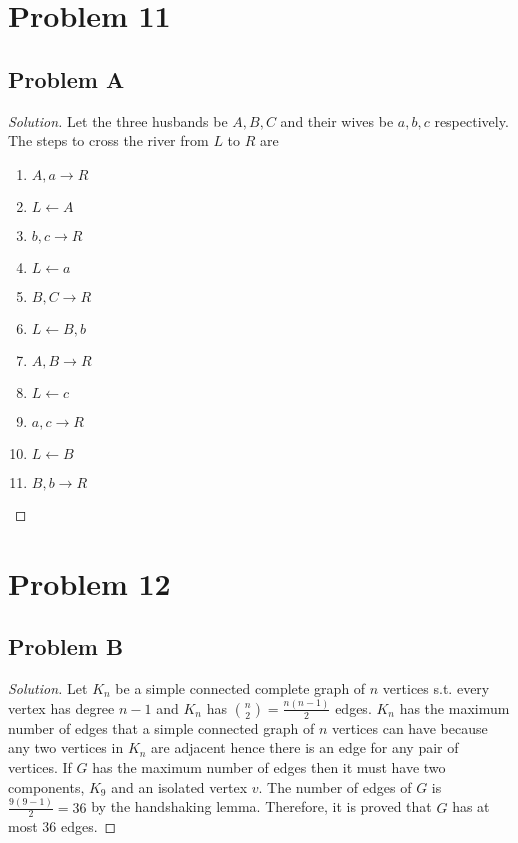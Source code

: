 \documentclass[12pt]{article}
\newenvironment{solution}{\begin{proof}[Solution]}{\end{proof}}
\begin{document}
\section*{Problem 11}
\subsection*{Problem A}
\begin{solution}
    Let the three husbands be \(A,B,C\) and their wives be \(a,b,c\) respectively.
    The steps to cross the river from \(L\) to \(R\) are
    \begin{enumerate}
        \item \(A,a\rightarrow R\)
        \item \(L\leftarrow A\)
        \item \(b,c\rightarrow R\)
        \item \(L\leftarrow a\)
        \item \(B,C\rightarrow R\)
        \item \(L\leftarrow B,b\)
        \item \(A,B\rightarrow R\)
        \item \(L\leftarrow c\)
        \item \(a,c\rightarrow R\)
        \item \(L\leftarrow B\)
        \item \(B,b\rightarrow R\)
    \end{enumerate}
\end{solution}

\section*{Problem 12}
\subsection*{Problem B}
\begin{solution}
    Let \(K_n\) be a simple connected complete graph of \(n\) vertices s.t.
    every vertex has degree \(n-1\) and \(K_n\) has \(\binom{n}{2}=\frac{n(n-1)}{2}\)
    edges. \(K_n\) has the maximum number of edges that a simple connected graph
    of \(n\) vertices can have because any two vertices in \(K_n\) are adjacent
    hence there is an edge for any pair of vertices. If \(G\) has the maximum
    number of edges then it must have two components, \(K_9\) and an isolated
    vertex \(v\). The number of edges of \(G\) is \(\frac{9(9-1)}{2}=36\) by
    the handshaking lemma. Therefore, it is proved that \(G\) has at most 36 edges.
\end{solution}
\end{document}
